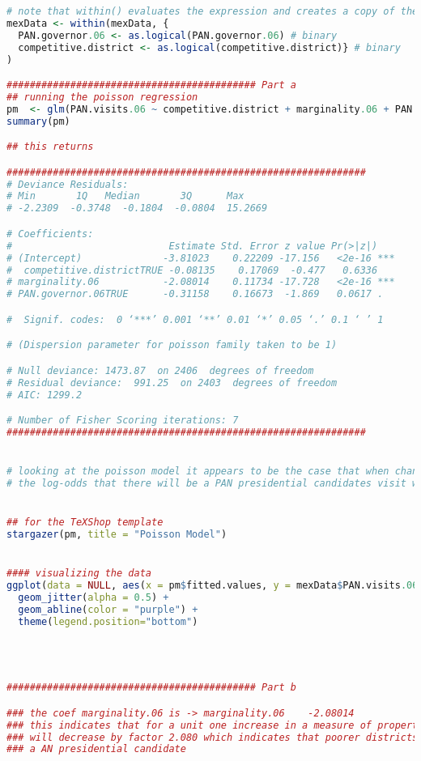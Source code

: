 \documentclass[12pt,letterpaper]{article}
\begin{document}
\begin{enumerate}
\begin{lstlisting}[language=R]
# note that within() evaluates the expression and creates a copy of the original dataset 
mexData <- within(mexData, {
  PAN.governor.06 <- as.logical(PAN.governor.06) # binary
  competitive.district <- as.logical(competitive.district)} # binary 
)

########################################### Part a
## running the poisson regression 
pm  <- glm(PAN.visits.06 ~ competitive.district + marginality.06 + PAN.governor.06, data = mexData, family = poisson)
summary(pm)

## this returns 

##############################################################
# Deviance Residuals: 
# Min       1Q   Median       3Q      Max  
# -2.2309  -0.3748  -0.1804  -0.0804  15.2669  

# Coefficients:
#                           Estimate Std. Error z value Pr(>|z|)    
# (Intercept)              -3.81023    0.22209 -17.156   <2e-16 ***
#  competitive.districtTRUE -0.08135    0.17069  -0.477   0.6336    
# marginality.06           -2.08014    0.11734 -17.728   <2e-16 ***
# PAN.governor.06TRUE      -0.31158    0.16673  -1.869   0.0617 .  

#  Signif. codes:  0 ‘***’ 0.001 ‘**’ 0.01 ‘*’ 0.05 ‘.’ 0.1 ‘ ’ 1

# (Dispersion parameter for poisson family taken to be 1)

# Null deviance: 1473.87  on 2406  degrees of freedom
# Residual deviance:  991.25  on 2403  degrees of freedom
# AIC: 1299.2

# Number of Fisher Scoring iterations: 7
##############################################################


# looking at the poisson model it appears to be the case that when changing from a safe swing seat, this decreases 
# the log-odds that there will be a PAN presidential candidates visit while holding all the other visits contant


## for the TeXShop template 
stargazer(pm, title = "Poisson Model")


#### visualizing the data
ggplot(data = NULL, aes(x = pm$fitted.values, y = mexData$PAN.visits.06)) +
  geom_jitter(alpha = 0.5) +
  geom_abline(color = "purple") +
  theme(legend.position="bottom")




########################################### Part b

### the coef marginality.06 is -> marginality.06    -2.08014
### this indicates that for a unit one increase in a measure of property, the log-odds of a PAN presidential candidates visit
### will decrease by factor 2.080 which indicates that poorer districts have a low probility of getting a visit from
### a AN presidential candidate



\end{lstlisting}
\end{enumerate}
\end{document}
